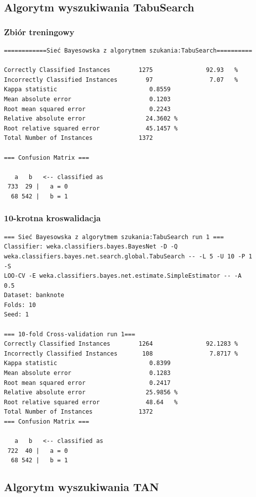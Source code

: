 \documentclass{classrep}
\begin{document}
\subsection{Algorytm wyszukiwania TabuSearch}
\subsubsection*{Zbiór treningowy}
\scriptsize 
\begin{verbatim}
============Sieć Bayesowska z algorytmem szukania:TabuSearch==========

Correctly Classified Instances        1275               92.93   %
Incorrectly Classified Instances        97                7.07   %
Kappa statistic                          0.8559
Mean absolute error                      0.1203
Root mean squared error                  0.2243
Relative absolute error                 24.3602 %
Root relative squared error             45.1457 %
Total Number of Instances             1372     

=== Confusion Matrix ===

   a   b   <-- classified as
 733  29 |   a = 0
  68 542 |   b = 1
\end{verbatim} 
\normalsize
\subsubsection*{10-krotna kroswalidacja}
\scriptsize 
\begin{verbatim}
=== Sieć Bayesowska z algorytmem szukania:TabuSearch run 1 ===
Classifier: weka.classifiers.bayes.BayesNet -D -Q
weka.classifiers.bayes.net.search.global.TabuSearch -- -L 5 -U 10 -P 1 -S
LOO-CV -E weka.classifiers.bayes.net.estimate.SimpleEstimator -- -A 0.5
Dataset: banknote
Folds: 10
Seed: 1

=== 10-fold Cross-validation run 1===
Correctly Classified Instances        1264               92.1283 %
Incorrectly Classified Instances       108                7.8717 %
Kappa statistic                          0.8399
Mean absolute error                      0.1283
Root mean squared error                  0.2417
Relative absolute error                 25.9856 %
Root relative squared error             48.64   %
Total Number of Instances             1372     
=== Confusion Matrix ===

   a   b   <-- classified as
 722  40 |   a = 0
  68 542 |   b = 1
\end{verbatim} 
\normalsize

\subsection{Algorytm wyszukiwania TAN}
\end{document}
